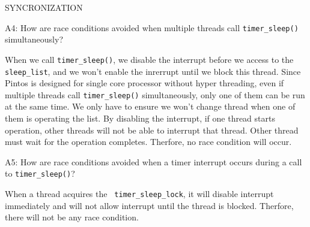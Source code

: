 \begin{aspect}{SYNCRONIZATION}
  \begin{qc}
    A4: How are race conditions avoided when multiple threads call \lstinline{timer_sleep()} simultaneously?
  \end{qc}
  When we call \lstinline{timer_sleep()}, we disable the interrupt before we access to the \lstinline{sleep_list}, and we won't enable the inrerrupt until we block this thread. Since Pintos is designed for single core processor without hyper threading, even if multiple threads call \lstinline{timer_sleep()} simultaneously, only one of them can be run at the same time. We only have to ensure we won't change thread when one of them is operating the list. By disabling the interrupt, if one thread starts operation, other threads will not be able to interrupt that thread. Other thread must wait for the operation completes. Therfore, no race condition will occur.
  \begin{qc}
    A5: How are race conditions avoided when a timer interrupt occurs during a call to \lstinline{timer_sleep()}?
  \end{qc}
  When a thread acquires the \lstinline{ timer_sleep_lock}, it will disable interrupt immediately and will not allow interrupt until the thread is blocked. Therfore, there will not be any race condition.
\end{aspect}

